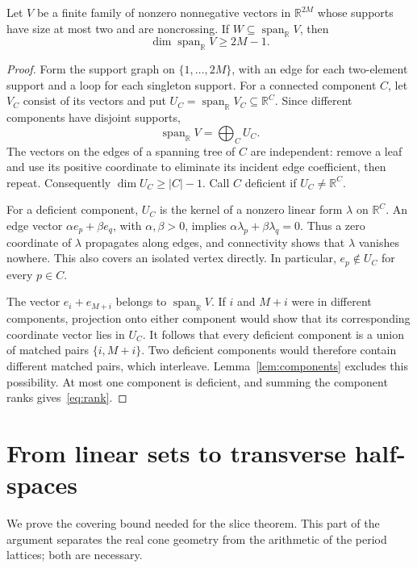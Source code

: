 \documentclass[a4paper,USenglish,cleveref,autoref]{lipics-v2021}
\newcommand{\R}{\mathbb R}
\newcommand{\spanR}{\operatorname{span}_{\R}}
\begin{document}
\begin{lemma}\label{lem:rank}
Let $V$ be a finite family of nonzero nonnegative vectors in $\R^{2M}$ whose supports have size at most two and are noncrossing.
If $W\subseteq\spanR V$, then
\begin{equation}\label{eq:rank}
 \dim\spanR V\geq 2M-1.
\end{equation}
\end{lemma}
\begin{proof}
Form the support graph on $\{1,\ldots,2M\}$, with an edge for each two-element support and a loop for each singleton support.
For a connected component $C$, let $V_C$ consist of its vectors and put $U_C=\spanR V_C\subseteq\R^C$.
Since different components have disjoint supports,
\[
 \spanR V=\bigoplus_C U_C.
\]
The vectors on the edges of a spanning tree of $C$ are independent: remove a leaf and use its positive coordinate to eliminate its incident edge coefficient, then repeat.
Consequently $\dim U_C\geq |C|-1$.
Call $C$ deficient if $U_C\ne\R^C$.

For a deficient component, $U_C$ is the kernel of a nonzero linear form $\lambda$ on $\R^C$.
An edge vector $\alpha e_p+\beta e_q$, with $\alpha,\beta>0$, implies $\alpha\lambda_p+\beta\lambda_q=0$.
Thus a zero coordinate of $\lambda$ propagates along edges, and connectivity shows that $\lambda$ vanishes nowhere.
This also covers an isolated vertex directly.
In particular, $e_p\notin U_C$ for every $p\in C$.

The vector $e_i+e_{M+i}$ belongs to $\spanR V$.
If $i$ and $M+i$ were in different components, projection onto either component would show that its corresponding coordinate vector lies in $U_C$.
It follows that every deficient component is a union of matched pairs $\{i,M+i\}$.
Two deficient components would therefore contain different matched pairs, which interleave.
Lemma~\ref{lem:components} excludes this possibility.
At most one component is deficient, and summing the component ranks gives~\eqref{eq:rank}.
\end{proof}

\section{From linear sets to transverse half-spaces}
We prove the covering bound needed for the slice theorem.
This part of the argument separates the real cone geometry from the arithmetic of the period lattices; both are necessary.
\end{document}
